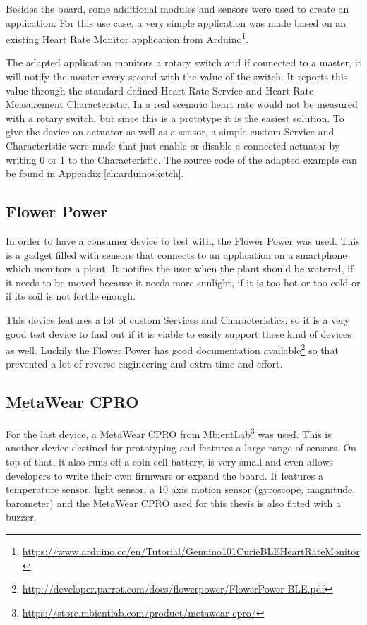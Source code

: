 \documentclass[pdftex,a4paper,12pt,twoside]{report}
\begin{document}
Besides the board, some additional modules and sensors were used to create an application. For this use case, a very simple application was made based on an existing Heart Rate Monitor application from Arduino\footnote{\url{https://www.arduino.cc/en/Tutorial/Genuino101CurieBLEHeartRateMonitor}}.

The adapted application monitors a rotary switch and if connected to a master, it will notify the master every second with the value of the switch. It reports this value through the standard defined Heart Rate Service and Heart Rate Measurement Characteristic. In a real scenario heart rate would not be measured with a rotary switch, but since this is a prototype it is the easiest solution. To give the device an actuator as well as a sensor, a simple custom Service and Characteristic were made that just enable or disable a connected actuator by writing 0 or 1 to the Characteristic. The source code of the adapted example can be found in Appendix \ref{ch:arduinosketch}.

\subsection{Flower Power}
\label{subsec:flowerpower}
In order to have a consumer device to test with, the Flower Power was used. This is a gadget filled with sensors that connects to an application on a smartphone which monitors a plant. It notifies the user when the plant should be watered, if it needs to be moved because it needs more sunlight, if it is too hot or too cold or if its soil is not fertile enough.

This device features a lot of custom Services and Characteristics, so it is a very good test device to find out if it is viable to easily support these kind of devices as well. Luckily the Flower Power has good documentation available\footnote{\url{http://developer.parrot.com/docs/flowerpower/FlowerPower-BLE.pdf}} so that prevented a lot of reverse engineering and extra time and effort.

\subsection{MetaWear CPRO}
\label{subsec:metawearcpro}
For the last device, a MetaWear CPRO from MbientLab\footnote{\url{https://store.mbientlab.com/product/metawear-cpro/}} was used. This is another device destined for prototyping and features a large range of sensors. On top of that, it also runs off a coin cell battery, is very small and even allows developers to write their own firmware or expand the board. It features a temperature sensor, light sensor, a 10 axis motion sensor (gyroscope, magnitude, barometer) and the MetaWear CPRO used for this thesis is also fitted with a buzzer.
\end{document}
